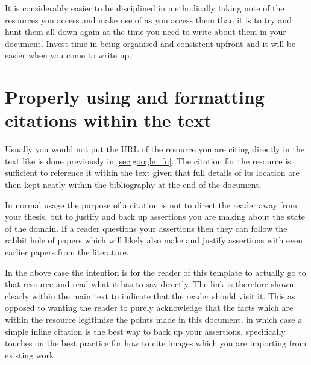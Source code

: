 It is considerably easier to be disciplined in methodically taking note of the resources you access and make use of as you access them than it is to try and hunt them all down again at the time you need to write about them in your document.
Invest time in being organised and consistent upfront and it will be easier when you come to write up.


	\section{Properly using and formatting citations within the text}

Usually you would not put the URL of the resource you are citing directly in the text like is done previously in \cref{sec:google_fu}.
The citation for the resource \cite{gwern} is sufficient to reference it within the text given that full details of its location are then kept neatly within the bibliography at the end of the document.

In normal usage the purpose of a citation is not to direct the reader away from your thesis, but to justify and back up assertions you are making about the state of the domain.
If a reader questions your assertions then they can follow the rabbit hole of papers which will likely also make and justify assertions with even earlier papers from the literature. 

In the above case the intention is for the reader of this template to actually go to that resource and read what it has to say directly.
The link is therefore shown clearly within the main text to indicate that the reader should visit it.
This as opposed to wanting the reader to purely acknowledge that the facts which are within the resource legitimise the points made in this document, in which case a simple inline citation is the best way to back up your assertions.
 specifically touches on the best practice for how to cite images which you are importing from existing work. 
